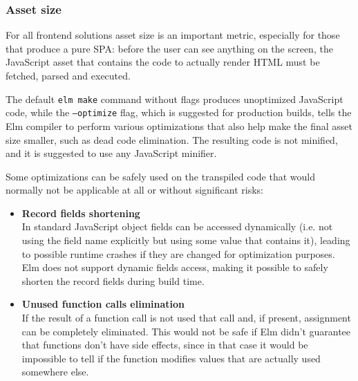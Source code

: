\subsubsection{Asset size}
For all frontend solutions asset size is an important metric, especially for those that produce a pure SPA: before the user can see anything on the screen, the JavaScript asset that contains the code to actually render HTML must be fetched, parsed and executed.

The default \texttt{elm make} command without flags produces unoptimized JavaScript code, while the \texttt{--optimize} flag, which is suggested for production builds, tells the Elm compiler to perform various optimizations that also help make the final asset size smaller, such as dead code elimination. The resulting code is not minified, and it is suggested to use any JavaScript minifier. \cite{noauthor_minification_nodate}

Some optimizations can be safely used on the transpiled code that would normally not be applicable at all or without significant risks:
\begin{itemize}
    \item \textbf{Record fields shortening}\\In standard JavaScript object fields can be accessed dynamically (i.e. not using the field name explicitly but using some value that contains it), leading to possible runtime crashes if they are changed for optimization purposes. Elm does not support dynamic fields access, making it possible to safely shorten the record fields during build time.
    \item \textbf{Unused function calls elimination}\\If the result of a function call is not used that call and, if present, assignment can be completely eliminated. This would not be safe if Elm didn't guarantee that functions don't have side effects, since in that case it would be impossible to tell if the function modifies values that are actually used somewhere else.
\end{itemize}
